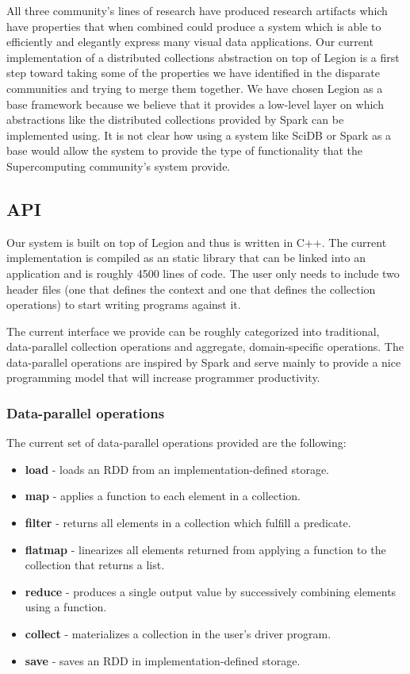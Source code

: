 \documentclass[tog]{acmsiggraph}
\begin{document}
All three community's lines of research have produced research artifacts which
have properties that when combined could produce a system which is able to
efficiently and elegantly express many visual data applications. Our current
implementation of a distributed collections abstraction on top of Legion is a
first step toward taking some of the properties we have identified in the
disparate communities and trying to merge them together. We have chosen Legion
as a base framework because we believe that it provides a low-level layer on
which abstractions like the distributed collections provided by Spark can be
implemented using. It is not clear how using a system like SciDB or Spark as a
base would allow the system to provide the type of functionality that
the Supercomputing community's system provide.

\subsection{API}

Our system is built on top of Legion and thus is written in C++. The current
implementation is compiled as an static library that can be linked into an
application and is roughly 4500 lines of code. The user only needs to include
two header files (one that defines the context and one that defines the
collection operations) to start writing programs against it.

The current interface we provide can be roughly categorized into traditional,
data-parallel collection operations and aggregate, domain-specific
operations. The data-parallel operations are inspired by Spark and serve mainly
to provide a nice programming model that will increase programmer productivity.

\subsubsection{Data-parallel operations}
The current set of data-parallel operations provided are the following:

\begin{itemize}
\item \textbf{load} - loads an RDD from an implementation-defined storage.
\item \textbf{map} - applies a function to each element in a collection.
\item \textbf{filter} - returns all elements in a collection which fulfill a
predicate.
\item \textbf{flatmap} - linearizes all elements returned from applying a
  function to the collection that returns a list.
\item \textbf{reduce} - produces a single output value by successively combining
  elements using a function.
\item \textbf{collect} - materializes a collection in the user's driver program.
\item \textbf{save} - saves an RDD in implementation-defined storage.
\end{itemize}
\end{document}
